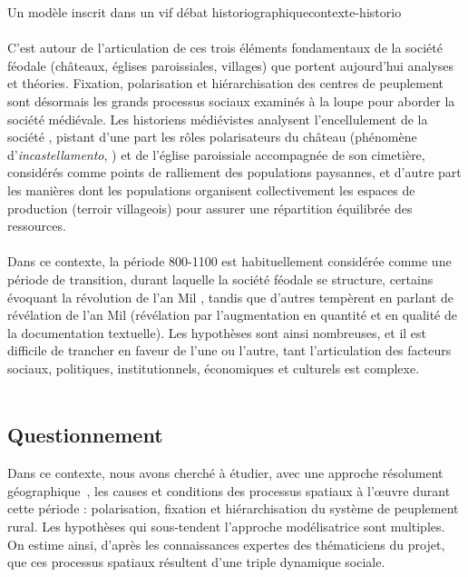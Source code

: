 \begin{encadre}{Un modèle inscrit dans un vif débat historiographique}{contexte-historio}
\paragraph[espace]{}
\noindent C'est autour de l'articulation de ces trois éléments fondamentaux de la société féodale (châteaux, églises paroissiales, villages) que portent aujourd'hui analyses et théories.
Fixation, polarisation et hiérarchisation des centres de peuplement sont désormais les grands processus sociaux examinés à la loupe pour aborder la société médiévale.
Les historiens médiévistes analysent l'\og encellulement\fg{} de la société \autocite{fossier_enfance_1982}, pistant d'une part les rôles polarisateurs du château (phénomène d'\textit{incastellamento}, \cite{toubert_les_1973}) et de l'église paroissiale accompagnée de son cimetière, considérés comme points de ralliement des populations paysannes, et d'autre part les manières dont les populations organisent collectivement les espaces de production (terroir villageois) pour assurer une répartition équilibrée des ressources.

\paragraph[espace]{}
\noindent Dans ce contexte, la période 800-1100 est habituellement considérée comme une période de transition, durant laquelle la société féodale se structure, certains évoquant la \og révolution de l'an Mil\fg{} \autocite{fossier_enfance_1982}, tandis que d'autres tempèrent en parlant de \og révélation de l'an Mil\fg{} \autocite{barthelemy_societe_1993} (\og révélation\fg{} par l'augmentation en quantité et en qualité de la documentation textuelle).
Les hypothèses sont ainsi nombreuses, et il est difficile de trancher en faveur de l'une ou l'autre, tant l'articulation des facteurs sociaux, politiques, institutionnels, économiques et culturels est complexe.
\fg{}\\
\mbox{}~ \hfill \cite[301-302]{cura_transition_2017} 
\end{encadre}

\subsection{Questionnement \label{subsec:questionnement-modele}}
\citereset
Dans ce contexte, nous avons cherché à étudier, avec une approche \og résolument géographique\fg{}~\autocite[302]{cura_transition_2017}, les causes et conditions des processus spatiaux à l'œuvre durant cette période : polarisation, fixation et hiérarchisation du système de peuplement rural.
Les hypothèses qui sous-tendent l'approche modélisatrice sont multiples.
On estime ainsi, d'après les connaissances expertes des thématiciens du projet, que ces processus spatiaux résultent d'une triple dynamique sociale.

